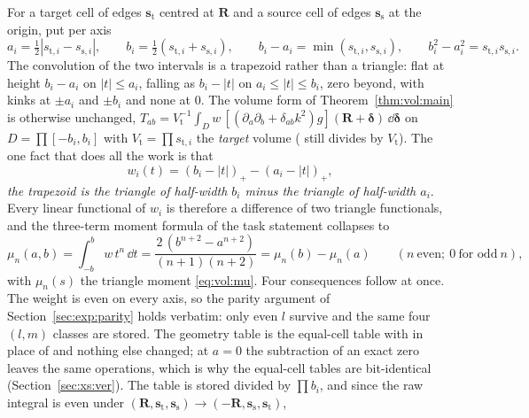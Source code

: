 For a target cell of edges $\mathbf{s}_{\mathrm{t}}$ centred at $\mathbf{R}$ and a source
cell of edges $\mathbf{s}_{\mathrm{s}}$ at the origin, put per axis
\begin{equation}
a_i = \tfrac12|s_{\mathrm{t},i}-s_{\mathrm{s},i}|,\qquad
b_i = \tfrac12(s_{\mathrm{t},i}+s_{\mathrm{s},i}),\qquad
b_i-a_i = \min(s_{\mathrm{t},i},s_{\mathrm{s},i}),\qquad
b_i^2-a_i^2 = s_{\mathrm{t},i}s_{\mathrm{s},i}.
\label{eq:xs:ab}
\end{equation}
The convolution of the two intervals is a trapezoid rather than a triangle: flat at height
$b_i-a_i$ on $|t|\le a_i$, falling as $b_i-|t|$ on $a_i\le|t|\le b_i$, zero beyond, with
kinks at $\pm a_i$ and $\pm b_i$ and none at $0$. The volume form of
Theorem~\ref{thm:vol:main} is otherwise unchanged,
$T_{ab} = V_{\mathrm{t}}^{-1}\int_D w\,[(\partial_a\partial_b+\delta_{ab}k^2)g](\mathbf{R}+\boldsymbol\delta)\,\dd\boldsymbol\delta$
on $D = \prod[-b_i,b_i]$ with $V_{\mathrm{t}} = \prod s_{\mathrm{t},i}$ the \emph{target}
volume ( still divides by $V_{\mathrm{t}}$). The one fact that does all the
work is that
\begin{equation}
w_i(t) = (b_i-|t|)_+ - (a_i-|t|)_+ ,
\label{eq:xs:diff}
\end{equation}
\emph{the trapezoid is the triangle of half-width $b_i$ minus the triangle of half-width
$a_i$}. Every linear functional of $w_i$ is therefore a difference of two triangle
functionals, and the three-term moment formula of the task statement collapses to
\begin{equation}
\mu_n(a,b) = \int_{-b}^{b}w\,t^n\,\dd t = \frac{2\,(b^{n+2}-a^{n+2})}{(n+1)(n+2)}
= \mu_n(b) - \mu_n(a)\qquad(n\ \text{even};\ 0\ \text{for odd}\ n),
\label{eq:xs:mu}
\end{equation}
with $\mu_n(s)$ the triangle moment \eqref{eq:vol:mu}. Four consequences follow at once.
The weight is even on every axis, so the parity argument of Section~\ref{sec:exp:parity}
holds verbatim: only even $l$ survive and the same four $(l,m)$ classes are stored. The
geometry table is the equal-cell table  with  in place
of  and nothing else changed; at $a = 0$ the subtraction of an exact zero
leaves the same  operations, which is why the equal-cell tables are
bit-identical (Section~\ref{sec:xs:ver}). The table is stored divided by $\prod b_i$, and
since the raw integral is even under $(\mathbf{R},\mathbf{s}_{\mathrm{t}},\mathbf{s}_{\mathrm{s}})
\to(-\mathbf{R},\mathbf{s}_{\mathrm{s}},\mathbf{s}_{\mathrm{t}})$,
